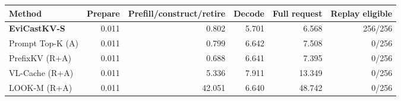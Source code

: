 \begin{tabular}{lrrrrr}
\toprule
Method & Prepare & Prefill/construct/retire & Decode & Full request & Replay eligible\\
\midrule
\textbf{EviCastKV-S} & 0.011 & 0.802 & 5.701 & 6.568 & 256/256\\
Prompt Top-K (A) & 0.011 & 0.799 & 6.642 & 7.508 & 0/256\\
PrefixKV (R+A) & 0.011 & 0.688 & 6.641 & 7.395 & 0/256\\
VL-Cache (R+A) & 0.011 & 5.336 & 7.911 & 13.349 & 0/256\\
LOOK-M (R+A) & 0.011 & 42.051 & 6.640 & 48.742 & 0/256\\
\bottomrule
\end{tabular}
